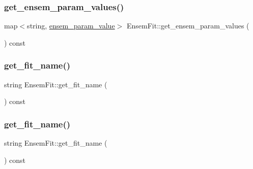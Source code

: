 \mbox{\label{classEnsemFit_aefa2dcc89aad7c209fac39ebba06372a}} 
\subsubsection{\texorpdfstring{get\_ensem\_param\_values()}{get\_ensem\_param\_values()}\hspace{0.1cm}{\footnotesize\ttfamily [2/2]}}
{\footnotesize\ttfamily map$<$string, \mbox{\hyperlink{structensem__param__value}{ensem\+\_\+param\+\_\+value}}$>$ Ensem\+Fit\+::get\+\_\+ensem\+\_\+param\+\_\+values (\begin{DoxyParamCaption}{ }\end{DoxyParamCaption}) const\hspace{0.3cm}{\ttfamily [inline]}}

\mbox{\label{classEnsemFit_a16f3c8ad4cdab894e5e4e1262bc9fcb6}} 
\subsubsection{\texorpdfstring{get\_fit\_name()}{get\_fit\_name()}\hspace{0.1cm}{\footnotesize\ttfamily [1/2]}}
{\footnotesize\ttfamily string Ensem\+Fit\+::get\+\_\+fit\+\_\+name (\begin{DoxyParamCaption}{ }\end{DoxyParamCaption}) const\hspace{0.3cm}{\ttfamily [inline]}}

\mbox{\label{classEnsemFit_a16f3c8ad4cdab894e5e4e1262bc9fcb6}} 
\subsubsection{\texorpdfstring{get\_fit\_name()}{get\_fit\_name()}\hspace{0.1cm}{\footnotesize\ttfamily [2/2]}}
{\footnotesize\ttfamily string Ensem\+Fit\+::get\+\_\+fit\+\_\+name (\begin{DoxyParamCaption}{ }\end{DoxyParamCaption}) const\hspace{0.3cm}{\ttfamily [inline]}}

